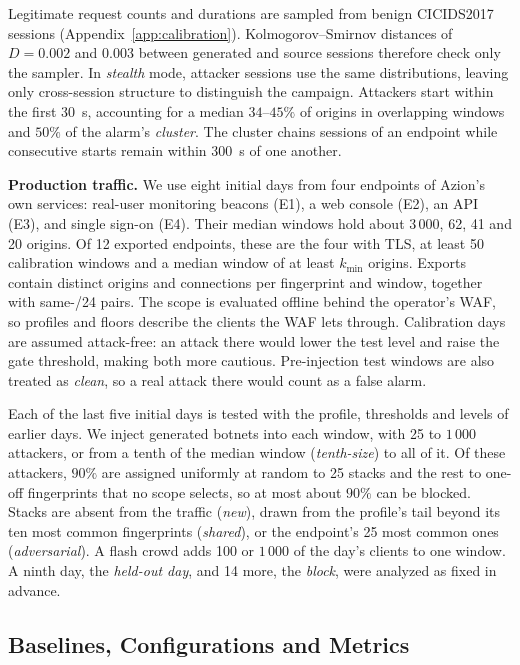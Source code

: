 \documentclass[conference,letterpaper,10pt]{IEEEtran}
\newcommand\1{\textit{(i)}}
\newcommand\2{\textit{(ii)}}
\newcommand\3{\textit{(iii)}}
\newcommand\4{\textit{(iv)}}
\newcommand\5{\textit{(v)}}
\newcommand\6{\textit{(vi)}}
\newcommand\7{\textit{(vii)}}
\newcommand\8{\textit{(viii)}}
\newcommand\9{\textit{(ix)}}
\begin{document}
Legitimate request counts and durations are sampled
from benign CICIDS2017 sessions
(Appendix~\ref{app:calibration}). Kolmogorov--Smirnov
distances of $D = 0.002$ and $0.003$ between generated
and source sessions therefore check only the sampler. In
\textit{stealth}
mode, attacker sessions use the same distributions,
leaving only cross-session structure to distinguish
the campaign. Attackers start within the first 30~s,
accounting for a median $34$--$45\%$ of origins in
overlapping windows and $50\%$ of the alarm's
\textit{cluster}. The cluster chains sessions of
an endpoint while consecutive starts remain within
300~s of one another.

\textbf{Production traffic.}
We use eight initial days from four endpoints of Azion's own
services: real-user monitoring beacons (E1),
a web console (E2), an API (E3), and single sign-on
(E4). Their median windows hold about $3\,000$, 62, 41 and 20 origins.
Of 12 exported endpoints, these are the four with TLS, at
least 50 calibration windows and a median window of at least
$k_{\min}$ origins. Exports contain distinct origins and
connections per fingerprint and window, together
with same-/24 pairs. The scope is evaluated offline
behind the operator's WAF, so profiles and floors describe
the clients the WAF lets through.
Calibration days are assumed attack-free: an attack there
would lower the test level and
raise the gate threshold, making both more cautious.
Pre-injection test windows are also treated as
\textit{clean}, so a real attack there would count as a
false alarm.

Each of the last five initial days is tested with the
profile, thresholds and levels of earlier days. We inject
generated botnets
into each window, with 25 to $1\,000$ attackers,
or from a tenth of the median window (\textit{tenth-size}) to all of it.
Of these attackers, $90\%$ are assigned uniformly at random
to 25 stacks and the rest to one-off fingerprints that no
scope selects, so at most about $90\%$ can be blocked.
Stacks are absent from the traffic (\textit{new}), drawn
from the profile's tail beyond its ten most common
fingerprints (\textit{shared}), or the endpoint's 25 most
common ones (\textit{adversarial}). A flash crowd adds 100
or $1\,000$ of the day's clients to one window. A ninth day,
the \textit{held-out day}, and 14 more, the \textit{block},
were analyzed as fixed in advance.

\subsection{Baselines, Configurations and Metrics}
\label{sec:configs}
\end{document}
